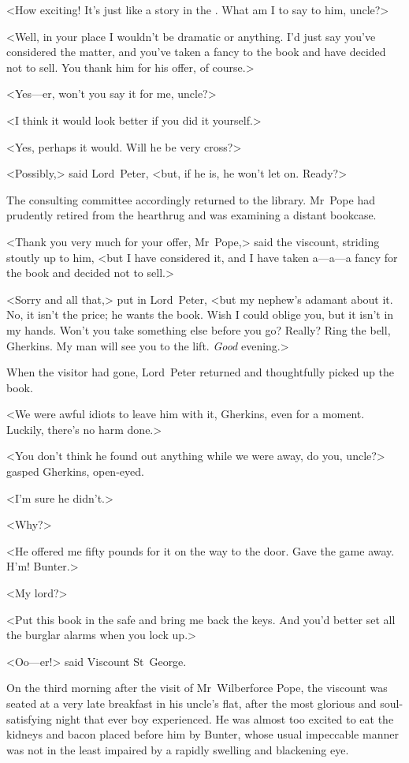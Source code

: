 <How exciting! It's just like a story in the . What am I to say to him, uncle?>

<Well, in your place I wouldn't be dramatic or anything. I'd just say you've considered the matter, and you've taken a fancy to the book and have decided not to sell. You thank him for his offer, of course.>

<Yes—er, won't you say it for me, uncle?>

<I think it would look better if you did it yourself.>

<Yes, perhaps it would. Will he be very cross?>

<Possibly,> said Lord~Peter, <but, if he is, he won't let on. Ready?>

The consulting committee accordingly returned to the library. Mr~Pope had prudently retired from the hearthrug and was examining a distant bookcase.

<Thank you very much for your offer, Mr~Pope,> said the viscount, striding stoutly up to him, <but I have considered it, and I have taken a—a—a fancy for the book and decided not to sell.>

<Sorry and all that,> put in Lord~Peter, <but my nephew's adamant about it. No, it isn't the price; he wants the book. Wish I could oblige you, but it isn't in my hands. Won't you take something else before you go? Really? Ring the bell, Gherkins. My man will see you to the lift. \emph{Good} evening.>

When the visitor had gone, Lord~Peter returned and thoughtfully picked up the book.

<We were awful idiots to leave him with it, Gherkins, even for a moment. Luckily, there's no harm done.>

<You don't think he found out anything while we were away, do you, uncle?> gasped Gherkins, open-eyed.

<I'm sure he didn't.>

<Why?>

<He offered me fifty pounds for it on the way to the door. Gave the game away. H'm! Bunter.>

<My lord?>

<Put this book in the safe and bring me back the keys. And you'd better set all the burglar alarms when you lock up.>

<Oo—er!> said Viscount St~George.

\divider
On the third morning after the visit of Mr~Wilberforce Pope, the viscount was seated at a very late breakfast in his uncle's flat, after the most glorious and soul-satisfying night that ever boy experienced. He was almost too excited to eat the kidneys and bacon placed before him by Bunter, whose usual impeccable manner was not in the least impaired by a rapidly swelling and blackening eye.

